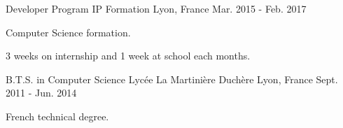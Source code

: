 

\begin{cventries}

  \cventry
  {Developer Program}%
  {IP Formation} %
  {Lyon, France} %
  {Mar. 2015 - Feb. 2017} %
    {
      \begin{cvitems} %
      \item {Computer Science formation.}
      \item {3 weeks on internship and 1 week at school each months.}
      \end{cvitems}
    }
  \cventry
  {B.T.S. in Computer Science} %
  {Lycée La Martinière Duchère} %
  {Lyon, France} %
  {Sept. 2011 - Jun. 2014} %
  {
    \begin{cvitems} %
    \item {French technical degree.}
    \end{cvitems}
  }
\end{cventries}

